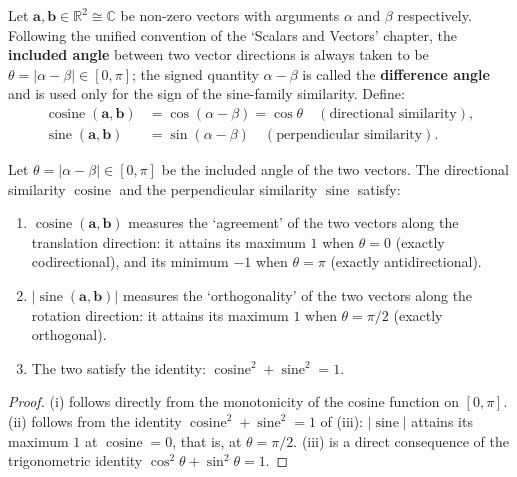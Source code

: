 \begin{definition}\label{def:basic_diff_similarity}
Let $\mathbf{a}, \mathbf{b} \in \mathbb{R}^2\cong\mathbb{C}$ be non-zero vectors with arguments $\alpha$ and $\beta$ respectively. Following the unified convention of the `Scalars and Vectors' chapter, the \textbf{included angle} between two vector directions is always taken to be $\theta=\lvert\alpha-\beta\rvert\in[0,\pi]$; the signed quantity $\alpha-\beta$ is called the \textbf{difference angle} and is used only for the sign of the sine-family similarity. Define:
\begin{align*}
\operatorname{cosine}(\mathbf{a}, \mathbf{b}) &= \cos(\alpha - \beta) = \cos\theta \quad (\text{directional similarity}), \\
\operatorname{sine}(\mathbf{a}, \mathbf{b}) &= \sin(\alpha - \beta) \quad (\text{perpendicular similarity}).
\end{align*}
\end{definition}

\begin{proposition}\label{prop:basic_diff_similarity_properties}
Let $\theta = \lvert\alpha-\beta\rvert \in [0, \pi]$ be the included angle of the two vectors. The directional similarity $\operatorname{cosine}$ and the perpendicular similarity $\operatorname{sine}$ satisfy:
\begin{enumerate}[label=(\roman*)]
    \item $\operatorname{cosine}(\mathbf{a}, \mathbf{b})$ measures the `agreement' of the two vectors along the translation direction: it attains its maximum $1$ when $\theta=0$ (exactly codirectional), and its minimum $-1$ when $\theta=\pi$ (exactly antidirectional).
    \item $\lvert\operatorname{sine}(\mathbf{a}, \mathbf{b})\rvert$ measures the `orthogonality' of the two vectors along the rotation direction: it attains its maximum $1$ when $\theta=\pi/2$ (exactly orthogonal).
    \item The two satisfy the identity: $\operatorname{cosine}^2 + \operatorname{sine}^2 = 1$.
\end{enumerate}
\end{proposition}

\begin{proof}
(i) follows directly from the monotonicity of the cosine function on $[0,\pi]$. (ii) follows from the identity $\operatorname{cosine}^2+\operatorname{sine}^2=1$ of (iii): $\lvert\operatorname{sine}\rvert$ attains its maximum $1$ at $\operatorname{cosine}=0$, that is, at $\theta=\pi/2$. (iii) is a direct consequence of the trigonometric identity $\cos^2\theta + \sin^2\theta = 1$.
\end{proof}

